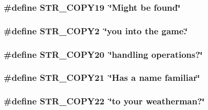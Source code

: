 \label{F__SPEAR_8H_acde25f14c0f0cc4649a9c6767e5fed67}
\hypertarget{F__SPEAR_8H_aa99f2b0e4d262f3dc345d1df4b8055f6}{
\subsubsection[{STR\_\-COPY19}]{\setlength{\rightskip}{0pt plus 5cm}\#define STR\_\-COPY19~\char`\"{}Might be found\char`\"{}}}
\label{F__SPEAR_8H_aa99f2b0e4d262f3dc345d1df4b8055f6}
\hypertarget{F__SPEAR_8H_a670b8012eb0974b72ab49e5202f722eb}{
\subsubsection[{STR\_\-COPY2}]{\setlength{\rightskip}{0pt plus 5cm}\#define STR\_\-COPY2~\char`\"{}you into the game.\char`\"{}}}
\label{F__SPEAR_8H_a670b8012eb0974b72ab49e5202f722eb}
\hypertarget{F__SPEAR_8H_a4126c47dbcda9c57ebc49b7eadacd0af}{
\subsubsection[{STR\_\-COPY20}]{\setlength{\rightskip}{0pt plus 5cm}\#define STR\_\-COPY20~\char`\"{}handling operations?\char`\"{}}}
\label{F__SPEAR_8H_a4126c47dbcda9c57ebc49b7eadacd0af}
\hypertarget{F__SPEAR_8H_a45129b40b4fe196e6f4ddde3bd8dd7b7}{
\subsubsection[{STR\_\-COPY21}]{\setlength{\rightskip}{0pt plus 5cm}\#define STR\_\-COPY21~\char`\"{}Has a name familiar\char`\"{}}}
\label{F__SPEAR_8H_a45129b40b4fe196e6f4ddde3bd8dd7b7}
\hypertarget{F__SPEAR_8H_ae864cbb961c9e408817d3d86336b4671}{
\subsubsection[{STR\_\-COPY22}]{\setlength{\rightskip}{0pt plus 5cm}\#define STR\_\-COPY22~\char`\"{}to your weatherman?\char`\"{}}}

